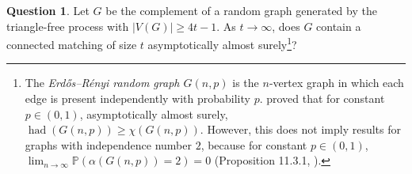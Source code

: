 \documentclass[11pt]{article}
\numberwithin{equation}{section}
\theoremstyle{plain}
\theoremstyle{definition}
\newtheorem{quest}[thm]{Question}
\renewcommand{\geq}{\geqslant}
\DeclareMathOperator{\had}{had}
\newcommand{\PP}{\mathbb{P}}
\newcommand{\defn}[1]{\textcolor{green!50!black}{\textit{#1}}}
\begin{document}
\begin{quest}
    Let $G$ be the complement of a random graph generated by the triangle-free process with $|V(G)| \geq 4t - 1$. As $t \to \infty$, does $G$ contain a connected matching of size $t$ asymptotically almost surely\footnote{The \defn{Erd\H{o}s--R\'enyi random graph $G(n, p)$} is the $n$-vertex graph in which each edge is present independently with probability $p$. \citet{bollobas_hadwigers_1980} proved that for constant $p \in (0,1)$, asymptotically almost surely, $\had(G(n,p)) \geq \chi(G(n,p))$. However, this does not imply results for graphs with independence number $2$, because for constant $p \in (0,1)$, $\lim_{n \to \infty}\PP(\alpha(G(n,p)) = 2) = 0$ (Proposition 11.3.1, \citep{Diestel05}).}?
\end{quest}

\fontsize{10pt}{11pt}
\selectfont


\end{document}
